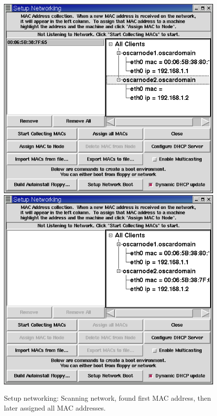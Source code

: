 \begin{figure}[h!]
  \begin{center}
    \centerline{
      \includegraphics[scale=\imgscale]{figs/6e_sbs-found-mac}
      \hspace{\imghskip}
      \includegraphics[scale=\imgscale]{figs/6f_sbs-stop-collect-mac2}
    }
    \caption[Setup networking: Assigning MACs to IPs]{Setup
      networking: Scanning network, found first MAC address, then
      later assigned all MAC addresses.}
    \label{fig:sbs-setup-network2}
  \end{center}
\end{figure}

